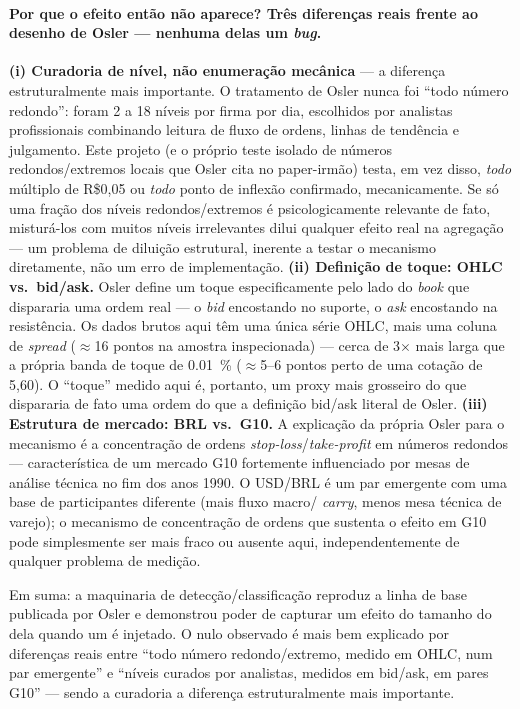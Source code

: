 \documentclass[11pt,a4paper]{article}
\begin{document}
\paragraph{Por que o efeito então não aparece? Três diferenças reais frente ao desenho de
Osler --- nenhuma delas um \emph{bug}.} \textbf{(i) Curadoria de nível, não enumeração
mecânica} --- a diferença estruturalmente mais importante. O tratamento de Osler nunca foi
``todo número redondo'': foram 2 a 18 níveis por firma por dia, escolhidos por analistas
profissionais combinando leitura de fluxo de ordens, linhas de tendência e julgamento. Este
projeto (e o próprio teste isolado de números redondos/extremos locais que Osler cita no
paper-irmão) testa, em vez disso, \emph{todo} múltiplo de R\$0,05 ou \emph{todo} ponto de
inflexão confirmado, mecanicamente. Se só uma fração dos níveis redondos/extremos é
psicologicamente relevante de fato, misturá-los com muitos níveis irrelevantes dilui qualquer
efeito real na agregação --- um problema de diluição estrutural, inerente a testar o mecanismo
diretamente, não um erro de implementação. \textbf{(ii) Definição de toque: OHLC vs.\
bid/ask.} Osler define um toque especificamente pelo lado do \emph{book} que dispararia uma
ordem real --- o \emph{bid} encostando no suporte, o \emph{ask} encostando na resistência. Os
dados brutos aqui têm uma única série OHLC, mais uma coluna de \emph{spread}
($\approx$16 pontos na amostra inspecionada) --- cerca de 3$\times$ mais larga que a própria
banda de toque de \SI{0.01}{\percent} ($\approx$5--6 pontos perto de uma cotação de 5,60). O
``toque'' medido aqui é, portanto, um proxy mais grosseiro do que dispararia de fato uma ordem
do que a definição bid/ask literal de Osler. \textbf{(iii) Estrutura de mercado: BRL vs.\
G10.} A explicação da própria Osler para o mecanismo \citep{osler2003} é a concentração de
ordens \emph{stop-loss}/\emph{take-profit} em números redondos --- característica de um
mercado G10 fortemente influenciado por mesas de análise técnica no fim dos anos 1990. O
USD/BRL é um par emergente com uma base de participantes diferente (mais fluxo macro/\emph{
carry}, menos mesa técnica de varejo); o mecanismo de concentração de ordens que sustenta o
efeito em G10 pode simplesmente ser mais fraco ou ausente aqui, independentemente de qualquer
problema de medição.

Em suma: a maquinaria de detecção/classificação reproduz a linha de base publicada por Osler e
demonstrou poder de capturar um efeito do tamanho do dela quando um é injetado. O nulo
observado é mais bem explicado por diferenças reais entre ``todo número redondo/extremo,
medido em OHLC, num par emergente'' e ``níveis curados por analistas, medidos em bid/ask, em
pares G10'' --- sendo a curadoria a diferença estruturalmente mais importante.
\end{document}
